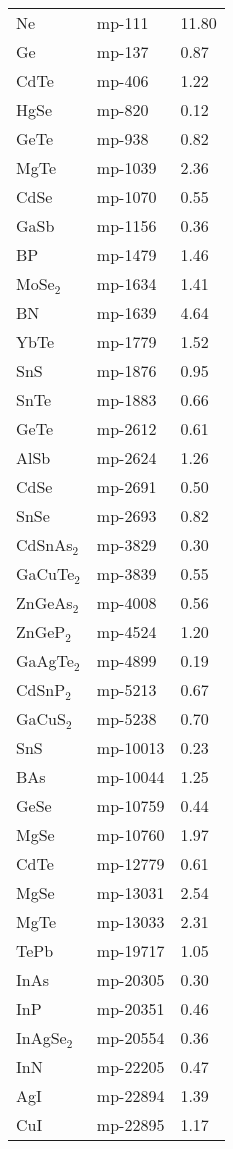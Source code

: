 \begin{center}
\begin{longtable}{M{3.0cm} M{3.0cm} M{3.5cm}}
\hline \hline
\endlastfoot
  Ne & mp-111 & 11.80 \\
  Ge & mp-137 & 0.87\\
  CdTe & mp-406 & 1.22\\
  HgSe & mp-820 & 0.12\\
  GeTe & mp-938 & 0.82\\
  MgTe & mp-1039 & 2.36\\
  CdSe & mp-1070 & 0.55\\
  GaSb & mp-1156 & 0.36\\
  BP & mp-1479 & 1.46\\
  MoSe$_2$ & mp-1634 & 1.41\\
  BN & mp-1639 & 4.64\\
  YbTe & mp-1779 & 1.52\\
  SnS & mp-1876 & 0.95\\
  SnTe & mp-1883 & 0.66\\
  GeTe & mp-2612 & 0.61\\
  AlSb & mp-2624 & 1.26\\
  CdSe & mp-2691 & 0.50\\
  SnSe & mp-2693 & 0.82\\
  CdSnAs$_2$ & mp-3829 & 0.30\\
  GaCuTe$_2$ & mp-3839 & 0.55\\
  ZnGeAs$_2$ & mp-4008 & 0.56\\
  ZnGeP$_2$ & mp-4524 & 1.20\\
  GaAgTe$_2$ & mp-4899 & 0.19\\
  CdSnP$_2$ & mp-5213 & 0.67\\
  GaCuS$_2$ & mp-5238 & 0.70\\
  SnS & mp-10013 & 0.23\\
  BAs & mp-10044 & 1.25\\
  GeSe & mp-10759 & 0.44\\
  MgSe & mp-10760 & 1.97\\
  CdTe & mp-12779 & 0.61\\
  MgSe & mp-13031 & 2.54\\
  MgTe & mp-13033 & 2.31\\
  TePb & mp-19717 & 1.05\\
  InAs & mp-20305 & 0.30\\
  InP & mp-20351 & 0.46\\
  InAgSe$_2$ & mp-20554 & 0.36\\
  InN & mp-22205 & 0.47\\
  AgI & mp-22894 & 1.39\\
  CuI & mp-22895 & 1.17\\

\end{longtable}
\end{center}
